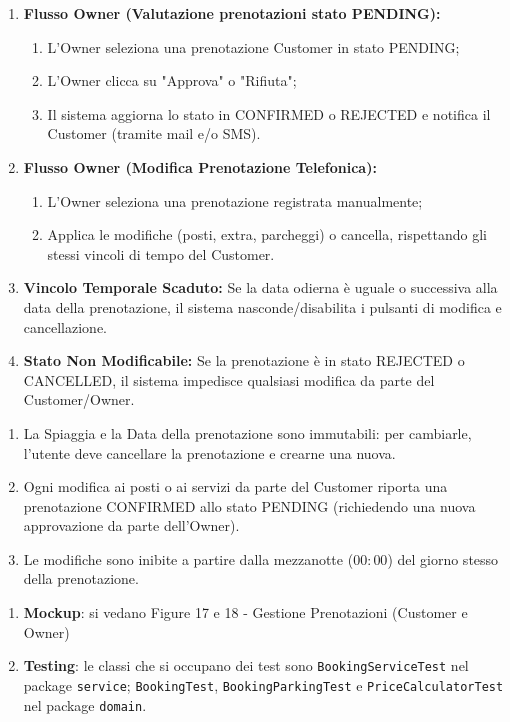 \documentclass{article}
\begin{document}
	{
		\begin{enumerate}[nosep, leftmargin=25px]
			\item[\textbf{5a.}] \textbf{Flusso Owner (Valutazione prenotazioni stato PENDING):} 
			\begin{enumerate}[nosep, leftmargin=*]
				\item[i.] L'Owner seleziona una prenotazione Customer in stato PENDING;
				\item[ii.] L'Owner clicca su "Approva" o "Rifiuta";
				\item[iii.] Il sistema aggiorna lo stato in CONFIRMED o REJECTED e notifica il Customer (tramite mail e/o SMS).
			\end{enumerate}
			\item[\textbf{5b.}] \textbf{Flusso Owner (Modifica Prenotazione Telefonica):} 
			\begin{enumerate}[nosep, leftmargin=*]
				\item[i.] L'Owner seleziona una prenotazione registrata manualmente;
				\item[ii.] Applica le modifiche (posti, extra, parcheggi) o cancella, rispettando gli stessi vincoli di tempo del Customer.
			\end{enumerate}
			\item[\textbf{4a-e.}] \textbf{Vincolo Temporale Scaduto:} Se la data odierna è uguale o successiva alla data della prenotazione, il sistema nasconde/disabilita i pulsanti di modifica e cancellazione.
			\item[\textbf{4b-e.}] \textbf{Stato Non Modificabile:} Se la prenotazione è in stato REJECTED o CANCELLED, il sistema impedisce qualsiasi modifica da parte del Customer/Owner.
		\end{enumerate}
	}
	{
		\begin{enumerate}[nosep, leftmargin=*]
			\item[•] La Spiaggia e la Data della prenotazione sono immutabili: per cambiarle, l'utente deve cancellare la prenotazione e crearne una nuova.
			\item[•] Ogni modifica ai posti o ai servizi da parte del Customer riporta una prenotazione CONFIRMED allo stato PENDING (richiedendo una nuova approvazione da parte dell'Owner).
			\item[•] Le modifiche sono inibite a partire dalla mezzanotte ($00:00$) del giorno stesso della prenotazione.
		\end{enumerate}
		
		\begin{enumerate}[leftmargin=*]
			\item[•] \textbf{Mockup}: si vedano Figure 17 e 18 - Gestione Prenotazioni (Customer e Owner)
			
			\item[•] \textbf{Testing}: le classi che si occupano dei test sono \texttt{BookingServiceTest} nel package \texttt{service}; \texttt{BookingTest}, \texttt{BookingParkingTest} e \texttt{PriceCalculatorTest} nel package \texttt{domain}.
		\end{enumerate}
	}
		
\end{document}
